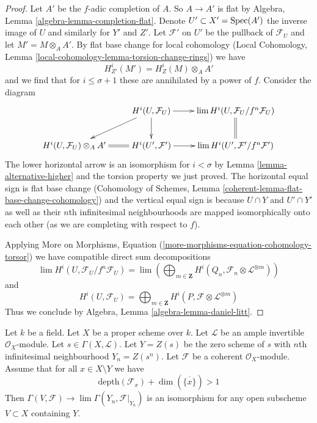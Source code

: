 \begin{proof}
\medskip\noindent
Let $A'$ be the $f$-adic completion of $A$. So $A \to A'$ is flat by
Algebra, Lemma \ref{algebra-lemma-completion-flat}.
Denote $U' \subset X' = \mathop{\mathrm{Spec}}(A')$ the inverse image of
$U$ and similarly for $Y'$ and $Z'$. Let $\mathcal{F}'$
on $U'$ be the pullback of $\mathcal{F}_U$ and let
$M' = M \otimes_A A'$.
By flat base change for local cohomology
(Local Cohomology, Lemma \ref{local-cohomology-lemma-torsion-change-rings})
we have
$$
H^i_{Z'}(M') = H^i_Z(M) \otimes_A A'
$$
and we find that for $i \leq \sigma + 1$
these are annihilated by a power of $f$. Consider the diagram
$$
\xymatrix{
& H^i(U, \mathcal{F}_U) \ar[ld] \ar[d] \ar[r] &
\lim H^i(U, \mathcal{F}_U/f^n\mathcal{F}_U) \ar@{=}[d] \\
H^i(U, \mathcal{F}_U) \otimes_A A' \ar@{=}[r] &
H^i(U', \mathcal{F}') \ar[r] &
\lim H^i(U', \mathcal{F}'/f^n\mathcal{F}')
}
$$
The lower horizontal arrow is an isomorphism for $i < \sigma$ by
Lemma \ref{lemma-alternative-higher} and the torsion
property we just proved. The horizontal equal sign is flat base change
(Cohomology of Schemes, Lemma \ref{coherent-lemma-flat-base-change-cohomology})
and the vertical equal sign is because $U \cap Y$ and $U' \cap Y'$
as well as their $n$th infinitesimal neighbourhoods
are mapped isomorphically onto each other (as we are
completing with respect to $f$).

\medskip\noindent
Applying More on Morphisms, Equation
(\ref{more-morphisms-equation-cohomology-torsor})
we have compatible direct sum decompositions
$$
\lim H^i(U, \mathcal{F}_U/f^n\mathcal{F}_U) =
\lim
\left(
\bigoplus\nolimits_{m \in \mathbf{Z}}
H^i(Q_n, \mathcal{F}_n \otimes \mathcal{L}^{\otimes m})
\right)
$$
and
$$
H^i(U, \mathcal{F}_U) =
\bigoplus\nolimits_{m \in \mathbf{Z}}
H^i(P, \mathcal{F} \otimes \mathcal{L}^{\otimes m})
$$
Thus we conclude by Algebra, Lemma \ref{algebra-lemma-daniel-litt}.
\end{proof}

\begin{lemma}
\label{lemma-lefschetz-addendum}
Let $k$ be a field. Let $X$ be a proper scheme over $k$.
Let $\mathcal{L}$ be an ample invertible $\mathcal{O}_X$-module.
Let $s \in \Gamma(X, \mathcal{L})$. Let $Y = Z(s)$ be the
zero scheme of $s$ with $n$th infinitesimal neighbourhood $Y_n = Z(s^n)$.
Let $\mathcal{F}$ be a coherent $\mathcal{O}_X$-module.
Assume that for all $x \in X \setminus Y$ we have
$$
\text{depth}(\mathcal{F}_x) + \dim(\overline{\{x\}}) > 1
$$
Then $\Gamma(V, \mathcal{F}) \to \lim \Gamma(Y_n, \mathcal{F}|_{Y_n})$
is an isomorphism for any open subscheme $V \subset X$ containing $Y$.
\end{lemma}

